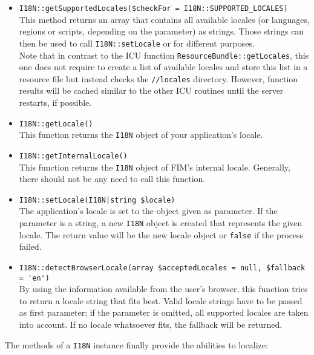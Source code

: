 \documentclass{scrartcl}
\begin{document}
      \begin{itemize}
         \item \lstinline!I18N::getSupportedLocales($checkFor = I18N::SUPPORTED_LOCALES)! \\
            This method returns an array that contains all available locales (or languages, regions or scripts, depending on the parameter) as strings. Those strings can then be used to call \lstinline!I18N::setLocale! or for different purposes. \\
            Note that in contrast to the ICU function \lstinline!ResourceBundle::getLocales!, this one does not require to create a list of available locales and store this list in a resource file but instead checks the \texttt{//locales} directory. However, function results will be cached similar to the other ICU routines until the server restarts, if possible.
         \item \lstinline!I18N::getLocale()! \\
            This function returns the \lstinline!I18N! object of your application's locale.
         \item \lstinline!I18N::getInternalLocale()! \\
            This function returns the \lstinline!I18N! object of FIM's internal locale. Generally, there should not be any need to call this function.
         \item \lstinline!I18N::setLocale(I18N|string $locale)! \\
            The application's locale is set to the object given as parameter. If the parameter is a string, a new \lstinline!I18N! object is created that represents the given locale. The return value will be the new locale object or \lstinline!false! if the process failed.
         \item \lstinline!I18N::detectBrowserLocale(array $acceptedLocales = null, $fallback = 'en')! \\
            By using the information available from the user's browser, this function tries to return a locale string that fits best. Valid locale strings have to be passed as first parameter; if the parameter is omitted, all supported locales are taken into account. If no locale whatsoever fits, the fallback will be returned.
      \end{itemize}
      The methods of a \lstinline!I18N! instance finally provide the abilities to localize:
\end{document}
